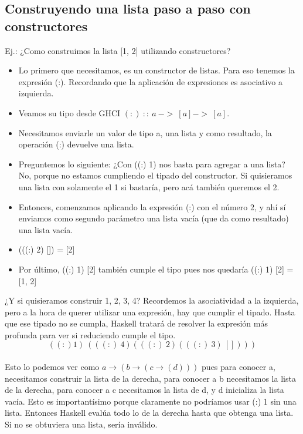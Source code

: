 \documentclass[10pt,a4paper]{article}
\begin{document}
\subsection*{Construyendo una lista paso a paso con constructores}
Ej.: ¿Como construimos la lista [1, 2] utilizando constructores?
\begin{itemize}
    \item Lo primero que necesitamos, es un constructor de listas. Para eso tenemos la expresión (:). Recordando que la aplicación de expresiones es asociativo a izquierda.
    \item Veamos su tipo desde GHCI $(:) \ :: \ a \ -> \ [a] -> \ [a]$.
    \item Necesitamos enviarle un valor de tipo a, una lista y como resultado, la operación (:) devuelve una lista. 
    \item Preguntemos lo siguiente: ¿Con ((:) 1) nos basta para agregar a una lista? No, porque no estamos cumpliendo el tipado del constructor. Si quisieramos una lista con solamente el 1 si bastaría, pero acá también queremos el 2.
    \item Entonces, comenzamos aplicando la expresión (:) con el número 2, y ahí sí enviamos como segundo parámetro una lista vacía (que da como resultado) una lista vacía.
    \item (((:) 2) []) = [2]
    \item Por último, ((:) 1) [2] también cumple el tipo pues nos quedaría ((:) 1) [2] = [1, 2]
\end{itemize}
¿Y si quisieramos construir 1, 2, 3, 4? Recordemos la asociatividad a la izquierda, pero a la hora de querer utilizar una expresión, hay que cumplir el tipado. Hasta que ese tipado no se cumpla, Haskell tratará de resolver la expresión más profunda para ver si reduciendo cumple el tipo. \\
\[((:) 1) \ (((:) \ 4)(((:) \ 2) (((:) \ 3) \ [])))\] \\
Esto lo podemos ver como $a \rightarrow (b \rightarrow (c \rightarrow (d))) $ pues para conocer a, necesitamos construir la lista de la derecha, para conocer a b necesitamos la lista de la derecha, para conocer a c necesitamos la lista de d, y d inicializa la lista vacía. Esto es importantísimo porque claramente no podríamos usar (:) 1 sin una lista. Entonces Haskell evalúa todo lo de la derecha hasta que obtenga una lista. Si no se obtuviera una lista, sería inválido.
\end{document}
